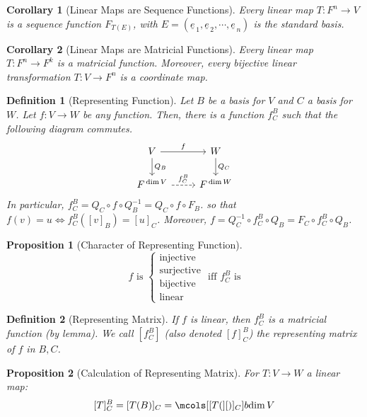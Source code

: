 \documentclass[12pt]{article}
\let\LR\Leftrightarrow
\newcommand{\tuple}[1]{\underline{#1}}
\newcommand{\seqt}[2]{\left(\tuple{#1}_{\,1},\tuple{#1}_{\,2},\cdots,\tuple{#1}_{\,#2}\right)}
\newtheorem{definition}{Definition}[subsection]
\newtheorem{proposition}{Proposition}[subsection]
\newtheorem{corollary}{Corollary}[subsection]
\begin{document}
\begin{corollary}[Linear Maps are Sequence Functions]
  Every linear map $T:F^n\to V$ is a sequence function $F_{T(E)}$, with $E=\seqt{e}{n}$ is the standard basis.
\end{corollary}

\begin{corollary}[Linear Maps are Matricial Functions]
  Every linear map $T: F^n\to F^k$ is a matricial function. Moreover, every bijective linear transformation $T: V\to F^n$ is a coordinate map.
\end{corollary}

\begin{definition}[Representing Function]
  Let $B$ be a basis for $V$ and $C$ a basis for $W$. Let $f: V\to W$ be any function. Then, there is a function
  $f^B_C$ such that the following diagram commutes.
  $$
  \begin{tikzcd}
    V \arrow{r}{f} \arrow{d}{Q_B}
    & W \arrow{d}{Q_C}\\
    F^{\,\dim V} \arrow[dashed]{r}{f_C^B}
    & F^{\,\dim W}
  \end{tikzcd}
  $$
  In particular, $f^B_C= Q_C\circ f \circ Q_B^{-1}= Q_C\circ f \circ F_B$. so that $f(v)=u\LR f^B_C([v]_B)=[u]_C$. Moreover, $f=Q_C^{-1}\circ f^B_C \circ Q_B=F_C\circ f^B_C\circ Q_B$.
\end{definition}

\begin{proposition}[Character of Representing Function]
  $$
  f\text{ is }\begin{cases}\text{injective}\\\text{surjective}\\\text{bijective}\\\text{linear}\end{cases}\text{ iff }f^B_C\text{ is}
  $$
\end{proposition}

\begin{definition}[Representing Matrix]
  If $f$ is linear, then $f^B_C$ is a matricial function (by lemma). We call $[f^B_C]$ (also denoted $[f]^B_C$) the representing matrix of $f$ in $B,C$.
\end{definition}

\begin{proposition}[Calculation of Representing Matrix]
  For $T:V\to W$ a linear map:
  $$[T]^B_C=[T(B)]_C=\mcols[{[T(}][{)]_C}]{b}{\dim V}$$
\end{proposition}
\end{document}
